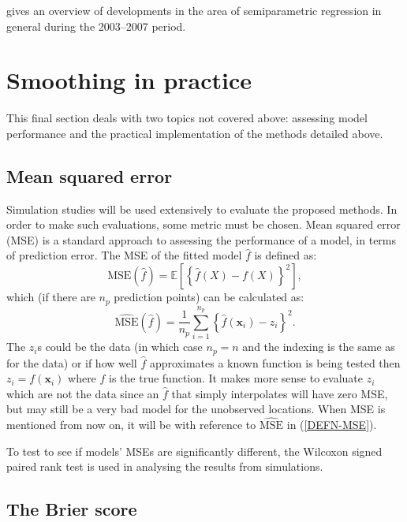 \cite{ruppertreview} gives an overview of developments in the area of semiparametric regression in general during the 2003--2007 period.

\section{Smoothing in practice}
\label{intro-inpractice}

This final section deals with two topics not covered above: assessing model performance and the practical implementation of the methods detailed above.

\subsection{Mean squared error}

Simulation studies will be used extensively to evaluate the proposed methods. In order to make such evaluations, some metric must be chosen. Mean squared error (MSE) is a standard approach to assessing the performance of a model, in terms of prediction error. The MSE of the fitted model $\hat{f}$ is defined as:
\begin{equation*}
\text{MSE}(\hat{f}) = \mathbb{E}\left [\left \{ \hat{f}(X) - f(X) \right \}^2 \right ],
\end{equation*}
which (if there are $n_p$ prediction points) can be calculated as:
\begin{equation}
\widehat{\text{MSE}}(\hat{f}) = \frac{1}{n_p} \sum_{i=1}^{n_p} \left \{\hat{f}(\mathbf{x}_i) - z_i \right \}^2.
\label{DEFN-MSE}
\end{equation}
The $z_i$s could be the data (in which case $n_p=n$ and the indexing is the same as for the data) or if how well $\hat{f}$ approximates a known function is being tested then $z_i=f(\mathbf{x}_i)$ where $f$ is the true function. It makes more sense to evaluate $z_i$ which are not the data since an $\hat{f}$ that simply interpolates will have zero MSE, but may still be a very bad model for the unobserved locations. When MSE is mentioned from now on, it will be with reference to $\widehat{\text{MSE}}$ in (\ref{DEFN-MSE}).

To test to see if models' MSEs are significantly different, the Wilcoxon signed paired rank test is used in analysing the results from simulations.

\subsection{The Brier score}
\label{DEFN-brier}

